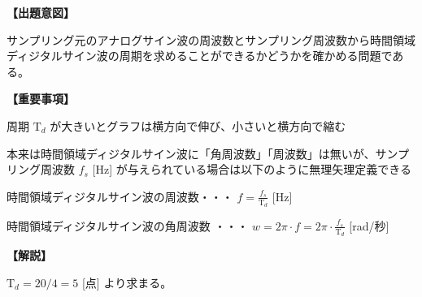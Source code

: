 \noindent \textbf{【出題意図】}

\bigskip
\noindent サンプリング元のアナログサイン波の周波数とサンプリング周波数から時間領域ディジタルサイン波の周期を求めることができるかどうかを確かめる問題である。

\vspace{1em}
\noindent \textbf{【重要事項】}

\bigskip
\noindent 周期 $\textrm{T}_d$ が大きいとグラフは横方向で伸び、小さいと横方向で縮む

\bigskip
\noindent 本来は時間領域ディジタルサイン波に「角周波数」「周波数」は無いが、サンプリング周波数 $f_s$ [Hz] が与えられている場合は以下のように無理矢理定義できる

\bigskip
\noindent 時間領域ディジタルサイン波の周波数・・・ $f = \frac{f_s}{\textrm{T}_d}$ [Hz]

\bigskip
\noindent 時間領域ディジタルサイン波の角周波数 ・・・ $w = 2\pi \cdot f = 2 \pi \cdot \frac{f_s}{\textrm{T}_d}$ [rad/秒]

\bigskip

\vspace{1em}
\noindent \textbf{【解説】}

\bigskip
\noindent $\textrm{T}_d = 20/4 = 5$ [点] より求まる。
